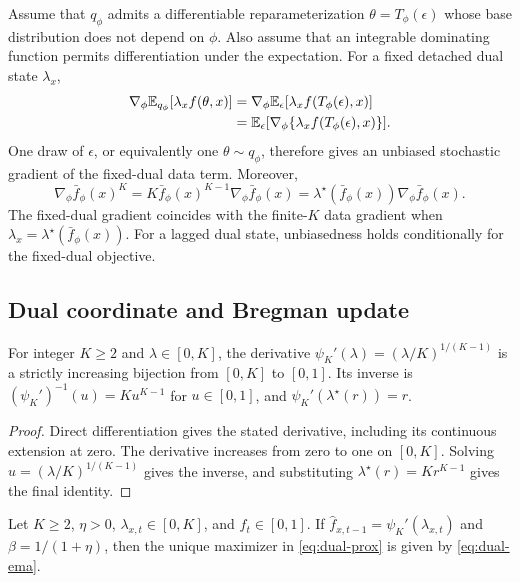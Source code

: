 Assume that $q_\phi$ admits a differentiable reparameterization $\theta=T_\phi(\epsilon)$ whose base distribution does not depend on $\phi$.
Also assume that an integrable dominating function permits differentiation under the expectation.
For a fixed detached dual state $\lambda_x$,
\begin{align}
  \nabla_\phi\mathbb E_{q_\phi}[\lambda_x f(\theta,x)]
  &=
  \nabla_\phi\mathbb E_\epsilon[\lambda_x f(T_\phi(\epsilon),x)]
  \notag\\
  &=
  \mathbb E_\epsilon[\nabla_\phi\{\lambda_x f(T_\phi(\epsilon),x)\}].
  \label{eq:app-fixed-dual-gradient}
\end{align}
One draw of $\epsilon$, or equivalently one $\theta\sim q_\phi$, therefore gives an unbiased stochastic gradient of the fixed-dual data term.
Moreover,
\begin{equation}
  \nabla_\phi\bar f_\phi(x)^K
  =
  K\bar f_\phi(x)^{K-1}\nabla_\phi\bar f_\phi(x)
  =
  \lambda^\star(\bar f_\phi(x))\nabla_\phi\bar f_\phi(x).
  \label{eq:app-finite-k-gradient}
\end{equation}
The fixed-dual gradient coincides with the finite-$K$ data gradient when $\lambda_x=\lambda^\star(\bar f_\phi(x))$.
For a lagged dual state, unbiasedness holds conditionally for the fixed-dual objective.

\subsection{Dual coordinate and Bregman update}
\label{app:bregman-proof}

\begin{lemma}
\label{lem:dual-coordinate}
For integer $K\geq2$ and $\lambda\in[0,K]$, the derivative $\psi_K'(\lambda)=(\lambda/K)^{1/(K-1)}$ is a strictly increasing bijection from $[0,K]$ to $[0,1]$.
Its inverse is $(\psi_K')^{-1}(u)=Ku^{K-1}$ for $u\in[0,1]$, and $\psi_K'(\lambda^\star(r))=r$.
\end{lemma}

\begin{proof}
Direct differentiation gives the stated derivative, including its continuous extension at zero.
The derivative increases from zero to one on $[0,K]$.
Solving $u=(\lambda/K)^{1/(K-1)}$ gives the inverse, and substituting $\lambda^\star(r)=Kr^{K-1}$ gives the final identity.
\end{proof}

\begin{proposition}
\label{prop:bregman-update}
Let $K\geq2$, $\eta>0$, $\lambda_{x,t}\in[0,K]$, and $f_t\in[0,1]$.
If $\widehat f_{x,t-1}=\psi_K'(\lambda_{x,t})$ and $\beta=1/(1+\eta)$, then the unique maximizer in \cref{eq:dual-prox} is given by \cref{eq:dual-ema}.
\end{proposition}

